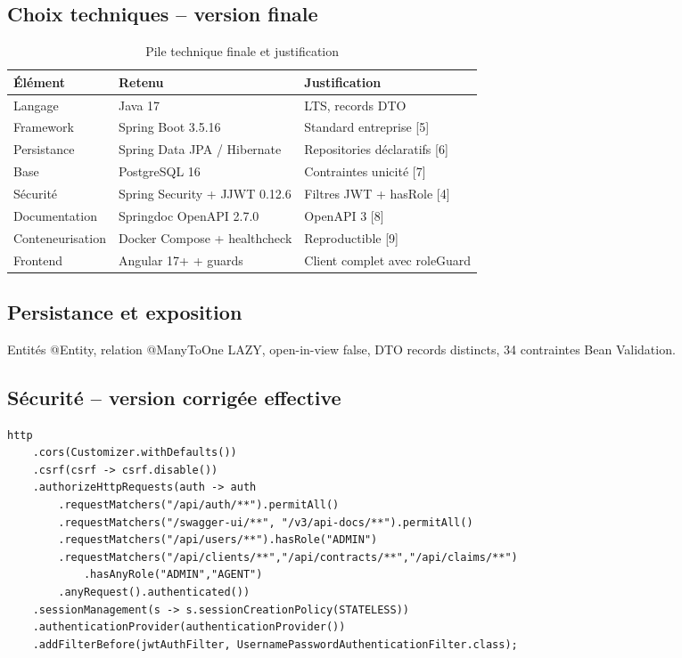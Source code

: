 \documentclass[a4paper,12pt]{article}
\newcommand{\refbib}[1]{[#1]}
\begin{document}
\subsection{Choix techniques -- version finale}
\begin{table}[htbp]
\centering
\caption{Pile technique finale et justification}
\label{tab:stack}
\small
\begin{tabularx}{\linewidth}{@{}L{2.5cm} L{4.1cm} X@{}}
\toprule
\textbf{Élément} & \textbf{Retenu} & \textbf{Justification} \\
\midrule
Langage        & Java 17                          & LTS, records DTO \\
Framework      & Spring Boot 3.5.16               & Standard entreprise \refbib{5} \\
Persistance    & Spring Data JPA / Hibernate      & Repositories déclaratifs \refbib{6} \\
Base           & PostgreSQL 16                    & Contraintes unicité \refbib{7} \\
Sécurité       & Spring Security + JJWT 0.12.6    & Filtres JWT + hasRole \refbib{4} \\
Documentation  & Springdoc OpenAPI 2.7.0          & OpenAPI 3 \refbib{8} \\
Conteneurisation & Docker Compose + healthcheck   & Reproductible \refbib{9} \\
Frontend       & Angular 17+ + guards             & Client complet avec roleGuard \\
\bottomrule
\end{tabularx}
\end{table}

\subsection{Persistance et exposition}
Entités @Entity, relation @ManyToOne LAZY, open-in-view false, DTO records distincts, 34 contraintes Bean Validation.

\subsection{Sécurité -- version corrigée effective}
\begin{lstlisting}[caption={Chaîne de filtres -- autorisation par rôle effective (corrigée depuis version initiale où @PreAuthorize était inopérant).},label={lst:security}]
http
    .cors(Customizer.withDefaults())
    .csrf(csrf -> csrf.disable())
    .authorizeHttpRequests(auth -> auth
        .requestMatchers("/api/auth/**").permitAll()
        .requestMatchers("/swagger-ui/**", "/v3/api-docs/**").permitAll()
        .requestMatchers("/api/users/**").hasRole("ADMIN")
        .requestMatchers("/api/clients/**","/api/contracts/**","/api/claims/**")
            .hasAnyRole("ADMIN","AGENT")
        .anyRequest().authenticated())
    .sessionManagement(s -> s.sessionCreationPolicy(STATELESS))
    .authenticationProvider(authenticationProvider())
    .addFilterBefore(jwtAuthFilter, UsernamePasswordAuthenticationFilter.class);
\end{lstlisting}
\end{document}
